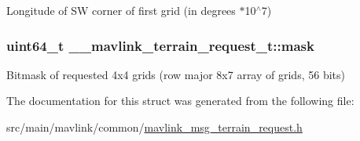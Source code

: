 Longitude of S\+W corner of first grid (in degrees $\ast$10$^\wedge$7) 

\hypertarget{struct____mavlink__terrain__request__t_a81eac7818d26faaa87b3770a79f4570b}{
\subsubsection[{mask}]{\setlength{\rightskip}{0pt plus 5cm}uint64\+\_\+t \+\_\+\+\_\+mavlink\+\_\+terrain\+\_\+request\+\_\+t\+::mask}}\label{struct____mavlink__terrain__request__t_a81eac7818d26faaa87b3770a79f4570b}


Bitmask of requested 4x4 grids (row major 8x7 array of grids, 56 bits) 



The documentation for this struct was generated from the following file\+:\begin{DoxyCompactItemize}
\item 
src/main/mavlink/common/\hyperlink{mavlink__msg__terrain__request_8h}{mavlink\+\_\+msg\+\_\+terrain\+\_\+request.\+h}\end{DoxyCompactItemize}
